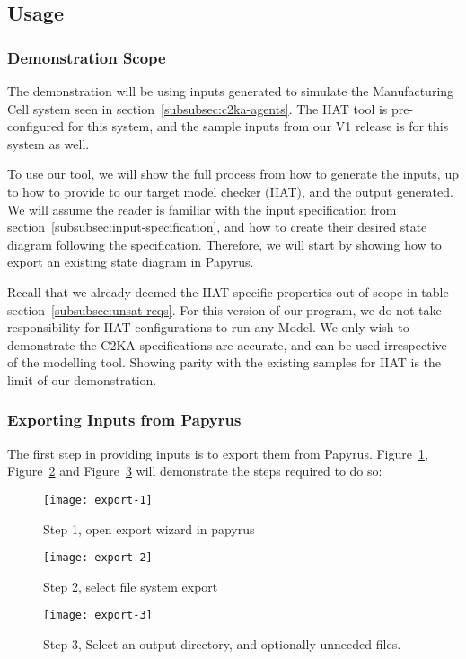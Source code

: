 \subsection{Usage}\label{subsec:usage}
\subsubsection{Demonstration Scope}\label{subsubsec:scope}
The demonstration will be using inputs generated to simulate the Manufacturing Cell system seen in section~\ref{subsubsec:c2ka-agents}.
The IIAT tool is pre-configured for this system, and the sample inputs from our V1 release is for this system as well.

To use our tool, we will show the full process from how to generate the inputs,
up to how to provide to our target model checker (IIAT), and the output generated.
We will assume the reader is familiar with the input specification from section~\ref{subsubsec:input-specification},
and how to create their desired state diagram following the specification.
Therefore, we will start by showing how to export an existing state diagram in Papyrus.

Recall that we already deemed the IIAT specific properties out of scope in table section~\ref{subsubsec:unsat-reqs}.
For this version of our program, we do not take responsibility for IIAT configurations to run any Model.
We only wish to demonstrate the C2KA specifications are accurate, and can be used irrespective of the modelling tool.
Showing parity with the existing samples for IIAT is the limit of our demonstration.


\subsubsection{Exporting Inputs from Papyrus}
The first step in providing inputs is to export them from Papyrus.
Figure~\ref{fig:export-1}, Figure~\ref{fig:export-2} and Figure~\ref{fig:export-3} will demonstrate the steps required to do so:
\begin{figure}[ht]
    \centering
    \texttt{[image: export-1]}
    \caption{Step 1, open export wizard in papyrus}
    \label{fig:export-1}
\end{figure}
\begin{figure}[ht]
    \centering
    \texttt{[image: export-2]}
    \caption{Step 2, select file system export}
    \label{fig:export-2}
\end{figure}
\begin{figure}[ht]
    \centering
    \texttt{[image: export-3]}
    \caption{Step 3, Select an output directory, and optionally unneeded files.}
    \label{fig:export-3}
\end{figure}

